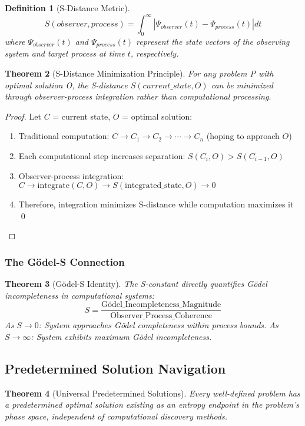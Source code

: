 \documentclass[12pt,a4paper]{article}
\newtheorem{theorem}{Theorem}[section]
\newtheorem{definition}[theorem]{Definition}
\begin{document}
{\begin{definition}[S-Distance Metric]
$$S(observer, process) = \int_0^{\infty} |\Psi_{observer}(t) - \Psi_{process}(t)| dt$$
where $\Psi_{observer}(t)$ and $\Psi_{process}(t)$ represent the state vectors of the observing system and target process at time $t$, respectively.
\end{definition}

\begin{theorem}[S-Distance Minimization Principle]
For any problem P with optimal solution O, the S-distance $S(current\_state, O)$ can be minimized through observer-process integration rather than computational processing.
\end{theorem}

\begin{proof}
Let $C$ = current state, $O$ = optimal solution:
\begin{enumerate}
\item Traditional computation: $C \to C_1 \to C_2 \to \cdots \to C_n$ (hoping to approach $O$)
\item Each computational step increases separation: $S(C_i, O) > S(C_{i-1}, O)$
\item Observer-process integration: $C \to \text{integrate}(C, O) \to S(\text{integrated\_state}, O) \to 0$
\item Therefore, integration minimizes S-distance while computation maximizes it \qed
\end{enumerate}
\end{proof}

\subsubsection{The Gödel-S Connection}

\begin{theorem}[Gödel-S Identity]
The S-constant directly quantifies Gödel incompleteness in computational systems:
$$S = \frac{\text{Gödel\_Incompleteness\_Magnitude}}{\text{Observer\_Process\_Coherence}}$$
As $S \to 0$: System approaches Gödel completeness within process bounds.
As $S \to \infty$: System exhibits maximum Gödel incompleteness.
\end{theorem}

\subsection{Predetermined Solution Navigation}

\begin{theorem}[Universal Predetermined Solutions]
Every well-defined problem has a predetermined optimal solution existing as an entropy endpoint in the problem's phase space, independent of computational discovery methods.
\end{theorem}

}
\end{document}
